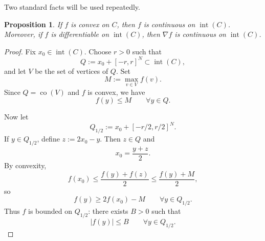 \documentclass[reqno]{amsart}
\newtheorem{proposition}[theorem]{Proposition}
\theoremstyle{definition}
\begin{document}
Two standard facts will be used repeatedly.

\begin{proposition}\label{prop:continuity-gradient}
If $f$ is convex on $C$, then $f$ is continuous on $\operatorname{int}(C)$.
Moreover, if $f$ is differentiable on $\operatorname{int}(C)$, then
$\nabla f$ is continuous on $\operatorname{int}(C)$.
\end{proposition}

\begin{proof}
Fix $x_0 \in \operatorname{int}(C)$. Choose $r>0$ such that
\begin{equation}
    Q:=x_0+[-r,r]^N \subset \operatorname{int}(C),
\end{equation}
and let $V$ be the set of vertices of $Q$. Set
\begin{equation}
    M:=\max_{v \in V} f(v).
\end{equation}
Since $Q=\operatorname{co}(V)$ and $f$ is convex, we have
\begin{equation}
    f(y) \leq M \qquad \forall y \in Q.
\end{equation}

Now let
\begin{equation}
    Q_{1/2}:=x_0+[-r/2,r/2]^N.
\end{equation}
If $y \in Q_{1/2}$, define $z:=2x_0-y$. Then $z \in Q$ and
\begin{equation}
    x_0=\frac{y+z}{2}.
\end{equation}
By convexity,
\begin{equation}
    f(x_0) \leq \frac{f(y)+f(z)}{2} \leq \frac{f(y)+M}{2},
\end{equation}
so
\begin{equation}
    f(y) \geq 2f(x_0)-M \qquad \forall y \in Q_{1/2}.
\end{equation}
Thus $f$ is bounded on $Q_{1/2}$: there exists $B>0$ such that
\begin{equation}
    |f(y)| \leq B \qquad \forall y \in Q_{1/2}.
\end{equation}


\end{proof}
\end{document}

